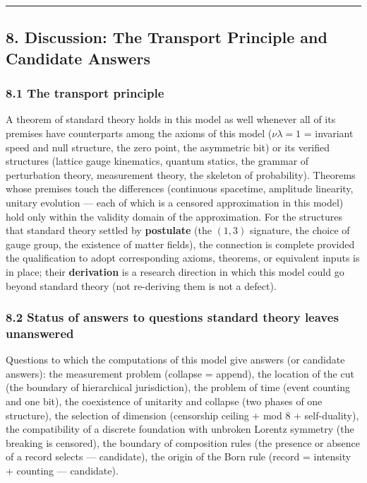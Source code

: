 \documentclass[
]{article}
\begin{document}
\begin{center}\rule{0.5\linewidth}{0.5pt}\end{center}

\subsection{8. Discussion: The Transport Principle and Candidate
Answers}\label{discussion-the-transport-principle-and-candidate-answers}

\subsubsection{8.1 The transport
principle}\label{the-transport-principle}

A theorem of standard theory holds in this model as well whenever all of
its premises have counterparts among the axioms of this model
(\(\nu\lambda=1\) = invariant speed and null structure, the zero point,
the asymmetric bit) or its verified structures (lattice gauge
kinematics, quantum statics, the grammar of perturbation theory,
measurement theory, the skeleton of probability). Theorems whose
premises touch the differences (continuous spacetime, amplitude
linearity, unitary evolution --- each of which is a censored
approximation in this model) hold only within the validity domain of the
approximation. For the structures that standard theory settled by
\textbf{postulate} (the \((1,3)\) signature, the choice of gauge group,
the existence of matter fields), the connection is complete provided the
qualification to adopt corresponding axioms, theorems, or equivalent
inputs is in place; their \textbf{derivation} is a research direction in
which this model could go beyond standard theory (not re-deriving them
is not a defect).

\subsubsection{8.2 Status of answers to questions standard theory leaves
unanswered}\label{status-of-answers-to-questions-standard-theory-leaves-unanswered}

Questions to which the computations of this model give answers (or
candidate answers): the measurement problem (collapse = append), the
location of the cut (the boundary of hierarchical jurisdiction), the
problem of time (event counting and one bit), the coexistence of
unitarity and collapse (two phases of one structure), the selection of
dimension (censorship ceiling + mod 8 + self-duality), the compatibility
of a discrete foundation with unbroken Lorentz symmetry (the breaking is
censored), the boundary of composition rules (the presence or absence of
a record selects --- candidate), the origin of the Born rule (record =
intensity + counting --- candidate).
\end{document}
